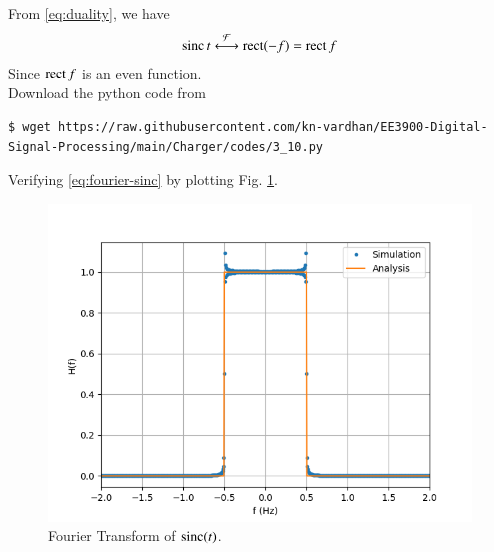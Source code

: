 \documentclass[journal,12pt,twocolumn]{IEEEtran}
\renewcommand\thesection{\arabic{section}}
\begin{document}
\begin{enumerate}[label=\thesection.\arabic*
,ref=\thesection.\theenumi]
\solution From \eqref{eq:duality}, we have 
\begin{align}
    \mathop{\mathrm{sinc}}{t}\overset{\mathcal{F}}{ \longleftrightarrow}\mathop{\mathrm{rect}}(-f)=\mathop{\mathrm{rect}}{f}
    \label{eq:fourier-sinc}
\end{align}
Since $\mathop{\mathrm{rect}}{f}$ is an even function.
\\
Download the python code from
\begin{lstlisting}
$ wget https://raw.githubusercontent.com/kn-vardhan/EE3900-Digital-Signal-Processing/main/Charger/codes/3_10.py
\end{lstlisting}
Verifying \eqref{eq:fourier-sinc}
by plotting Fig. \ref{fig:fourier-sinc}.
\begin{figure}[!ht]
    \includegraphics[width=\columnwidth]{figs/3_10.png}
    \caption{Fourier Transform of $\mathop{\mathrm{sinc}}(t)$.}
    \label{fig:fourier-sinc}
\end{figure}
\end{enumerate}
\end{document}
